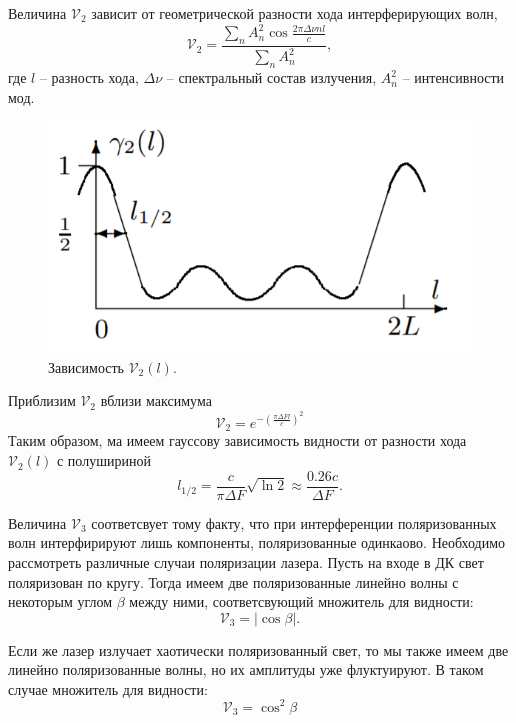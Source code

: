 \documentclass[12pt, a4paper]{article}
\newcommand{\V}{\mathcal{V}}
\begin{document}
Величина $\V_2$ зависит от геометрической разности хода интерферирующих волн,
$$ \V_2 = \dfrac{\sum\limits_n A^2_n \cos \frac{2\pi \Delta \nu n
            l}{c}}{\sum\limits_n A_n^2}, $$ где $l$ -- разность хода, $\Delta \nu$ --
спектральный состав излучения, $A_n^2$ -- интенсивности мод.
\begin{figure}[H]
    \begin{center}
        \includegraphics[scale=0.6]{pics/1.png}
    \end{center}
    \caption{Зависимость $\V_2(l)$.}
\end{figure}
\noindent Приблизим $\V_2$ вблизи максимума
$$
    \V_2 = e^{-\left(\frac{\pi \Delta F l}{c}\right)^2}
$$
Таким образом, ма имеем гауссову зависимость видности от разности хода $\V_2(l)$ с полушириной
\begin{equation}
    l_{1/2} = \dfrac{c}{\pi \Delta F}\sqrt{\ln 2} \approx \dfrac{0.26 c}{\Delta F}.
\end{equation}

Величина $\V_3$ соответсвует тому факту, что при интерференции поляризованных
волн интерфирируют лишь компоненты, поляризованные одинкаово. Необходимо
рассмотреть различные случаи поляризации лазера. Пусть на входе в ДК свет
поляризован по кругу. Тогда имеем две поляризованные линейно волны с некоторым
углом $\beta$ между ними, соответсвующий множитель для видности:
\begin{equation}
    \V_3 = |\cos \beta|.
\end{equation}

Если же лазер излучает хаотически поляризованный свет, то мы также имеем две линейно поляризованные волны, но их амплитуды уже флуктуируют. В таком случае множитель для видности:
\begin{equation}
    \V_3 = \cos^2 \beta
\end{equation}
\end{document}

